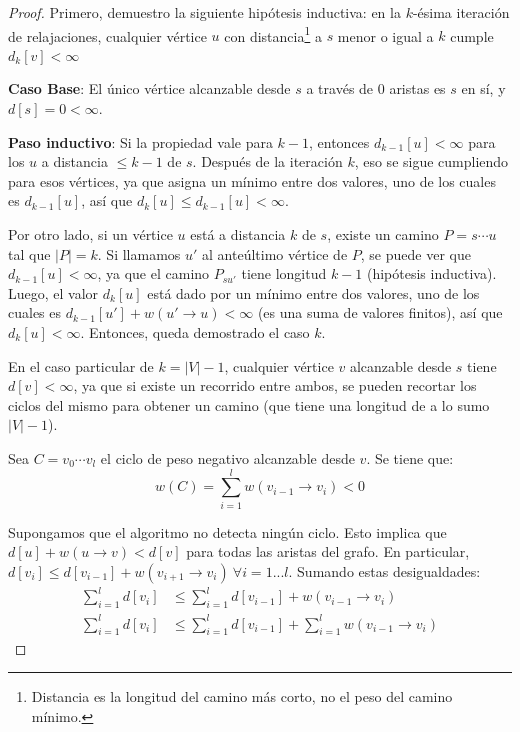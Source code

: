 \documentclass[a4paper]{report}
\begin{document}
\begin{proof}
    Primero, demuestro la siguiente hipótesis inductiva: en la $k$-ésima iteración de relajaciones, cualquier vértice $u$ con distancia\footnote{Distancia es la longitud del camino más corto, no el peso del camino mínimo.} a $s$ menor o igual a $k$ cumple $d_k[v] < \infty$

    \textbf{Caso Base}: El único vértice alcanzable desde $s$ a través de $0$ aristas es $s$ en sí, y $d[s] = 0 < \infty$.

    \textbf{Paso inductivo}: Si la propiedad vale para $k - 1$, entonces $d_{k - 1}[u] < \infty$ para los $u$ a distancia $\leq k - 1$ de $s$. Después de la iteración $k$, eso se sigue cumpliendo para esos vértices, ya que  asigna un mínimo entre dos valores, uno de los cuales es $d_{k - 1}[u]$, así que $d_k[u] \leq d_{k - 1}[u] < \infty$.

    Por otro lado, si un vértice $u$ está a distancia $k$ de $s$, existe un camino $P = s \cdots u$ tal que $|P| = k$. Si llamamos $u'$ al anteúltimo vértice de $P$, se puede ver que $d_{k - 1}[u] < \infty$, ya que el camino $P_{su'}$ tiene longitud $k - 1$ (hipótesis inductiva). Luego, el valor $d_k[u]$ está dado por un mínimo entre dos valores, uno de los cuales es $d_{k - 1}[u'] + w(u' \rightarrow u) < \infty$ (es una suma de valores finitos), así que $d_k[u] < \infty$. Entonces, queda demostrado el caso $k$.

    En el caso particular de $k = |V| - 1$, cualquier vértice $v$ alcanzable desde $s$ tiene $d[v] < \infty$, ya que si existe un recorrido entre ambos, se pueden recortar los ciclos del mismo para obtener un camino (que tiene una longitud de a lo sumo $|V| - 1$).

    Sea $C = v_0 \cdots v_l$ el ciclo de peso negativo alcanzable desde $v$. Se tiene que:
    $$w(C) = \sum_{i = 1}^l w(v_{i - 1} \rightarrow v_i) < 0$$

    Supongamos que el algoritmo no detecta ningún ciclo. Esto implica que $d[u] + w(u \rightarrow v) < d[v]$ para todas las aristas del grafo. En particular, $d[v_i] \leq d[v_{i - 1}] + w(v_{i + 1} \rightarrow v_i)\ \forall i = 1 ... l$. Sumando estas desigualdades:
    \begin{align*}
        \sum_{i = 1}^l d[v_i] & \leq \sum_{i = 1}^l d[v_{i - 1}] + w(v_{i - 1} \rightarrow v_i)                \\
        \sum_{i = 1}^l d[v_i] & \leq \sum_{i = 1}^l d[v_{i - 1}] + \sum_{i = 1}^l w(v_{i - 1} \rightarrow v_i)
    \end{align*}


\end{proof}
\end{document}
